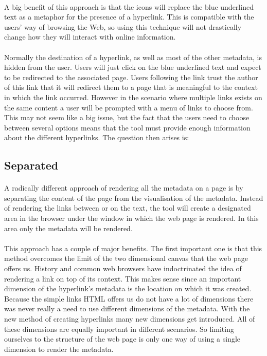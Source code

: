 	\paragraph{}
	A big benefit of this approach is that the icons will replace the blue underlined text as a metaphor for the presence of a hyperlink. This is compatible with the users' way of browsing the Web, so using this technique will not drastically change how they will interact with online information.
	\paragraph{}
	Normally the destination of a hyperlink, as well as most of the other metadata, is hidden from the user. Users will just click on the blue underlined text and expect to be redirected to the associated page. Users following the link trust the author of this link that it will redirect them to a page that is meaningful to the context in which the link occurred. However in the scenario where multiple links exists on the same content a user will be prompted with a menu of links to choose from. This may not seem like a big issue, but the fact that the users need to choose between several options means that the tool must provide enough information about the different hyperlinks. The question then arises is: 
	\subsection{Separated} \label{ssub:Separated}
	\paragraph{}
	A radically different approach of rendering all the metadata on a page is by separating the content of the page from the visualisation of the metadata. Instead of rendering the links between or on the text, the tool will create a designated area in the browser under the window in which the web page is rendered. In this area only the metadata will be rendered.
	\paragraph{}
	This approach has a couple of major benefits. The first important one is that this method overcomes the limit of the two dimensional canvas that the web page offers us. History and common web browsers have indoctrinated the idea of rendering a link on top of its context. This makes sense since an important dimension of the hyperlink's metadata is the location on which it was created. Because the simple links HTML offers us do not have a lot of dimensions there was never really a need to use different dimensions of the metadata. With the new method of creating hyperlinks many new dimensions get introduced. All of these dimensions are equally important in different scenarios. So limiting ourselves to the structure of the web page is only one way of using a single dimension to render the metadata.
